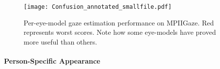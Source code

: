 
\begin{figure}
    \centering
    \texttt{[image: Confusion\_annotated\_smallfile.pdf]}
    \caption{Per-eye-model gaze estimation performance on MPIIGaze. Red represents worst scores. Note how some eye-models have proved more useful than others.
    }
    \label{fig:person_specific_training}
\end{figure}


\paragraph{Person-Specific Appearance}


